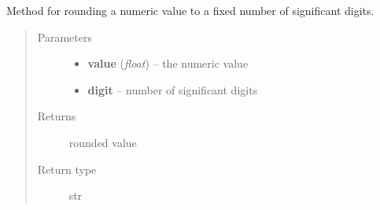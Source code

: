 \documentclass[a4paper,11pt,english]{sphinxmanual}
\begin{document}

\begin{fulllineitems}
\label{programming/utilities:jb_common.utils.base.round}
Method for rounding a numeric value to a fixed number of significant
digits.
\begin{quote}\begin{description}
\item[{Parameters}] \leavevmode\begin{itemize}
\item {} 
\textbf{value} (\emph{float}) -- the numeric value

\item {} 
\textbf{digit} -- number of significant digits

\end{itemize}

\item[{Returns}] \leavevmode
rounded value

\item[{Return type}] \leavevmode
str

\end{description}\end{quote}

\end{fulllineitems}

\end{document}
